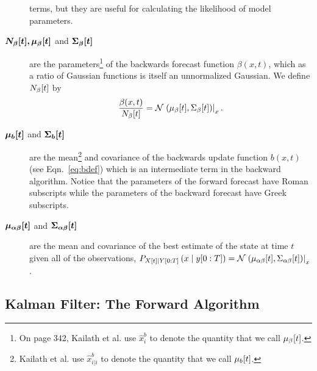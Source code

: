 \begin{description}
  terms, but they are useful for calculating the likelihood of model
  parameters.
\item[$\bm{{N_\beta}{[t]},{\mu_\beta}{[t]}}$ and
  $\bm{{\Sigma_\beta}{[t]}}$] are the parameters\footnote{On page
    342, Kailath et al.\cite{KSH00} use $\hat x_i^b$ to denote the
    quantity that we call ${\mu_\beta}{[t]}$.} of the
  backwards forecast function $\beta(x,t)$, which as a ratio of
  Gaussian functions is itself an unnormalized Gaussian.  We define
  ${N_\beta}{[t]}$ by
  \begin{equation*}
    \frac{\beta(x,t)}{{N_\beta}{[t]}} =
    {\mathcal{N}}\left.\left({\mu_\beta}{[t]},{\Sigma_\beta}{[t]}\right)\right|_{x}.
  \end{equation*}
\item[$\bm{{\mu_b}{[t]}}$ and $\bm{{\Sigma_b}{[t]}}$] are the
  mean\footnote{Kailath et al.\cite{KSH00} use $\hat x_{i|i}^b$ to
    denote the quantity that we call ${\mu_b}{[t]}$.} and covariance
  of the backwards update function $b(x,t)$ (see Eqn.~\eqref{eq:bdef})
  which is an intermediate term in the backward algorithm.  Notice
  that the parameters of the forward forecast have Roman subscripts
  while the parameters of the backward forecast have Greek subscripts.
\item[$\bm{{\mu_{\alpha\beta}}{[t]}}$ and
  $\bm{{\Sigma_{\alpha\beta}}{[t]}}$] are the mean and covariance
  of the best estimate of the state at time $t$ given all of the
  observations, \ie $P_{{X}{[t]}\mid Y[0:T]} \left(x\mid y[0:T]
  \right) =
  {\mathcal{N}}\left.\left({\mu_{\alpha\beta}}{[t]},{\Sigma_{\alpha\beta}}{[t]}\right)\right|_{x}$.
\end{description}


\subsection{Kalman Filter: The Forward Algorithm}

